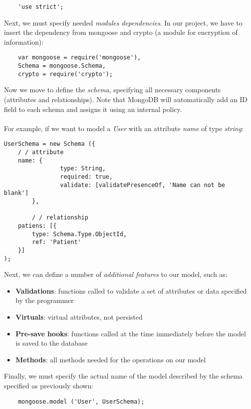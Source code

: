 	\begin{lstlisting}
	'use strict';
	\end{lstlisting}

Next, we must specify needed \emph{modules dependencies}. In our project, we have to insert the dependency from mongoose and crypto (a module for encryption of information):

	\begin{lstlisting}      
	var mongoose = require('mongoose'),
	Schema = mongoose.Schema,
	crypto = require('crypto');
	\end{lstlisting}

Now we move to define the \emph{schema}, specifying all necessary components (attributes and relationships). Note that MongoDB will automatically add an ID field to each schema and assigns it using an internal policy.
\\
\\For example, if we want to model a \emph{User} with an attribute \emph{name} of type \emph{string}:

\newpage

\begin{lstlisting} 
UserSchema = new Schema ({
  	/ / attribute
  	name: {
         		type: String,
         		required: true,
         		validate: [validatePresenceOf, 'Name can not be blank']
     	},

    	/ / relationship
   	patiens: [{
   		type: Schema.Type.ObjectId,
   		ref: 'Patient'
   	}]
); 
\end{lstlisting}

Next, we can define a number of \emph{additional features} to our model, such as:

\begin{itemize}
	\item \textbf{Validations}: functions called to validate a set of attributes or data specified by the programmer
	\item \textbf{Virtuals}: virtual attributes, not persisted
	\item \textbf{Pre-save hooks}: functions called at the time immediately before the model is saved to the database
	\item \textbf{Methods}: all methods needed for the operations on our model 
\end{itemize}

Finally, we must specify the actual name of the model described by the schema specified as previously shown:

\begin{lstlisting}
	mongoose.model ('User', UserSchema);
\end{lstlisting}


